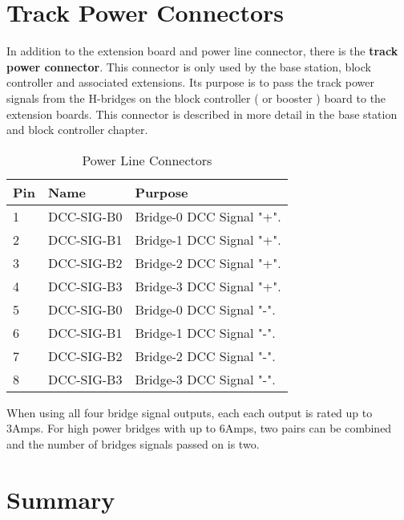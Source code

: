 \section{Track Power Connectors}

In addition to the extension board and power line connector, there is the \textbf{track power connector}. This connector is only used by the base station, block controller and associated extensions. Its purpose is to pass the track power signals from the H-bridges on the block controller ( or booster ) board to the extension boards. This connector is described in more detail in the base station and block controller chapter.

\begin{table}[!ht]
    \begin{center}
        \caption{Power Line Connectors}
        \begin{tabular}{|l|l|p{}|}
            \toprule
            \textbf{Pin} & \textbf{Name} & \textbf{Purpose} \\
            \midrule
            1 & DCC-SIG-B0 & Bridge-0 DCC Signal "+". \\
            \midrule
            2 & DCC-SIG-B1 & Bridge-1 DCC Signal "+". \\
            \midrule
            3 & DCC-SIG-B2 & Bridge-2 DCC Signal "+". \\
            \midrule
            4 & DCC-SIG-B3 & Bridge-3 DCC Signal "+". \\
            \midrule
            5 & DCC-SIG-B0 & Bridge-0 DCC Signal "-". \\
            \midrule
            6 & DCC-SIG-B1 & Bridge-1 DCC Signal "-". \\
            \midrule
            7 & DCC-SIG-B2 & Bridge-2 DCC Signal "-". \\
            \midrule
            8 & DCC-SIG-B3 & Bridge-3 DCC Signal "-". \\
            \bottomrule
        \end{tabular}
    \end{center}
\end{table}

\FloatBarrier

When using all four bridge signal outputs, each each output is rated up to 3Amps. For high power bridges with up to 6Amps, two pairs can be combined and the number of bridges signals passed on is two.

\section{Summary}

